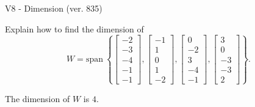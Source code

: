 \begin{exercise}
  \begin{exerciseTitle}V8 - Dimension (ver. 835)\end{exerciseTitle}
  \begin{exerciseStatement}
    Explain how to find the dimension of 
\[W=\mathrm{span}\ \left\{\left[\begin{array}{r}
-2 \\
-3 \\
-4 \\
-1 \\
-1
\end{array}\right] , \left[\begin{array}{r}
-1 \\
1 \\
0 \\
1 \\
-2
\end{array}\right] , \left[\begin{array}{r}
0 \\
-2 \\
3 \\
-4 \\
-1
\end{array}\right] , \left[\begin{array}{r}
3 \\
0 \\
-3 \\
-3 \\
2
\end{array}\right]\right\}.\]



  \end{exerciseStatement}
  \begin{exerciseAnswer}
   The dimension of \(W\) is  \(4\).
  


  \end{exerciseAnswer}
\end{exercise}